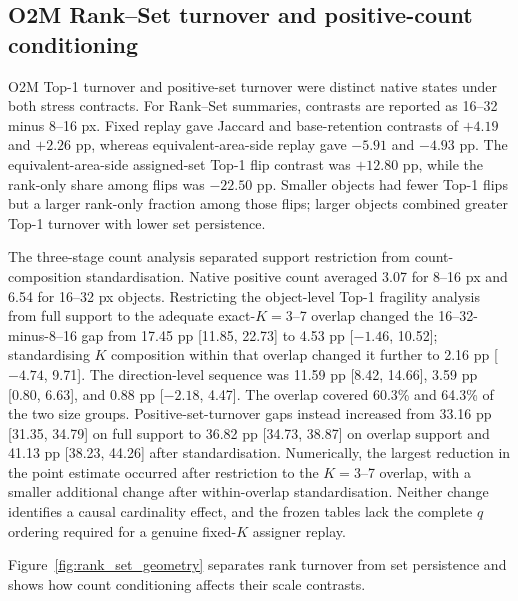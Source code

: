 \subsection{O2M Rank--Set turnover and positive-count conditioning}

O2M Top-1 turnover and positive-set turnover were distinct native states under both stress contracts. For Rank--Set summaries, contrasts are reported as 16--32 minus 8--16 px. Fixed replay gave Jaccard and base-retention contrasts of $+4.19$ and $+2.26$ pp, whereas equivalent-area-side replay gave $-5.91$ and $-4.93$ pp. The equivalent-area-side assigned-set Top-1 flip contrast was $+12.80$ pp, while the rank-only share among flips was $-22.50$ pp. Smaller objects had fewer Top-1 flips but a larger rank-only fraction among those flips; larger objects combined greater Top-1 turnover with lower set persistence.

The three-stage count analysis separated support restriction from count-composition standardisation. Native positive count averaged 3.07 for 8--16 px and 6.54 for 16--32 px objects. Restricting the object-level Top-1 fragility analysis from full support to the adequate exact-$K=3$--7 overlap changed the 16--32-minus-8--16 gap from 17.45 pp [11.85, 22.73] to 4.53 pp [$-1.46$, 10.52]; standardising $K$ composition within that overlap changed it further to 2.16 pp [$-4.74$, 9.71]. The direction-level sequence was 11.59 pp [8.42, 14.66], 3.59 pp [0.80, 6.63], and 0.88 pp [$-2.18$, 4.47]. The overlap covered 60.3\% and 64.3\% of the two size groups. Positive-set-turnover gaps instead increased from 33.16 pp [31.35, 34.79] on full support to 36.82 pp [34.73, 38.87] on overlap support and 41.13 pp [38.23, 44.26] after standardisation. Numerically, the largest reduction in the point estimate occurred after restriction to the $K=3$--7 overlap, with a smaller additional change after within-overlap standardisation. Neither change identifies a causal cardinality effect, and the frozen tables lack the complete $q$ ordering required for a genuine fixed-$K$ assigner replay.

Figure~\ref{fig:rank_set_geometry} separates rank turnover from set persistence and shows how count conditioning affects their scale contrasts.

